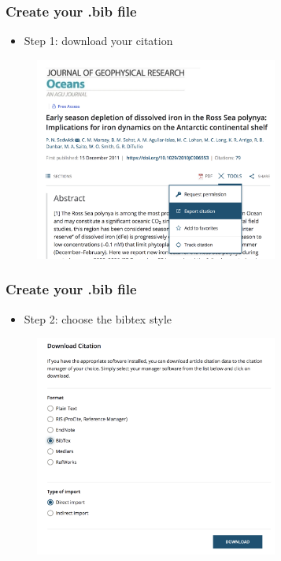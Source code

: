 \begin{frame}[fragile]
\frametitle{Create your .bib file}
\begin{itemize}
\item Step 1: download your citation
\end{itemize}
\begin{figure}
\includegraphics[width=80mm]{figures/Bib1.png}
\end{figure}
\end{frame}

\begin{frame}[fragile]
\frametitle{Create your .bib file}
\begin{itemize}
\item Step 2: choose the bibtex style
\end{itemize}
\begin{figure}
\includegraphics[width=80mm]{figures/Bib2.png}
\end{figure}
\end{frame}

